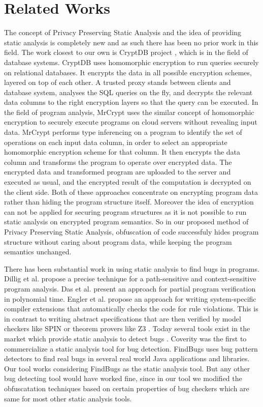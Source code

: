 \documentclass[twocolumn]{article}
\begin{document}
\section{Related Works}
The concept of Privacy Preserving Static Analysis and the idea of providing static analysis is completely new and as such there has been no prior work in this field. The work closest 
to our own is CryptDB project \cite{cryptdb}, which is in the field of database systems. CryptDB uses homomorphic encryption to run queries securely on relational databases. It encrypts 
the data in all possible encryption schemes, layered on top of each other. A trusted proxy stands between clients and database system, analyses the SQL queries on the fly, and decrypts 
the relevant data columns to the right encryption layers so that the query can be executed. In the field of program analysis, MrCrypt \cite{mrcrypt} uses the similar concept of homomorphic 
encryption to securely execute programs on cloud servers without revealing input data. MrCrypt performs type inferencing on a program to identify the set of operations on each input data 
column, in order to select an appropriate homomorphic encryption scheme for that column. It then encrypts the data column and transforms the program to operate over encrypted data. The 
encrypted data and transformed program are uploaded to the server and executed as usual, and the encrypted result of the computation is decrypted on the client side. Both of these 
approaches concentrate on encrypting program data rather than hiding the program structure itself. Moreover the idea of encryption can not be applied for securing program structures as 
it is not possible to run static analysis on encrypted program semantics. So in our proposed method of Privacy Preserving Static Analysis, obfuscation of code successfuly hides program 
structure without caring about program data, while keeping the program semantics unchanged.

There has been substantial work in using static analysis to find bugs in programs. Dillig et al. \cite{dillig} propose a precise technique for a path-sensitive and context-sensitive 
program analysis. Das et al. \cite{das} present an approach for partial program verification in polynomial time. Engler et al. \cite{engler} propose an approach for writing system-specific 
compiler extensions that automatically checks the code for rule violations. This is in contrast to writing abstract specifications that are then verified by model checkers like SPIN 
\cite{spin} or theorem provers like Z3 \cite{z3}. Today several tools exist in the market which provide static analysis to detect bugs \cite{coverity,klocwork,parasoft,findbugs,chess,saturn}. 
Coverity \cite{billionlinesofcode} was the first to commercialize a static analysis tool for bug detection. FindBugs \cite{findbugs} uses bug pattern detectors to find real bugs in 
several real world Java applications and libraries. Our tool works considering FindBugs as the static analysis tool. But any other bug detecting tool would have worked fine, since in 
our tool we modified the obfuscatation techniques based on certain properties of bug checkers which are same for most other static analysis tools.
\end{document}
